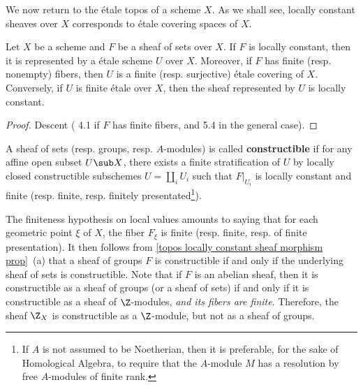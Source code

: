 We now return to the \'etale topos of a scheme $X$. As we shall see,  locally constant sheaves over $X$ corresponds to \'etale covering spaces of $X$.
\begin{proposition}\label{scheme etale locally constant sheaf represented by etale cover}
Let $X$ be a scheme and $F$ be a sheaf of sets over $X$. If $F$ is locally constant, then it is represented by a \'etale scheme $U$ over $X$. Moreover, if $F$ has finite (resp. nonempty) fibers, then $U$ is a finite (resp. surjective) \'etale covering of $X$. Conversely, if $U$ is finite \'etale over $X$, then the sheaf represented by $U$ is locally constant.
\end{proposition}
\begin{proof}
Descent (\cite{SGA1}  4.1 if $F$ has finite fibers, and \cite{SGA3}  5.4 in the general case).
\end{proof}

\begin{definition}
A sheaf of sets (resp. groups, resp. $A$-modules) is called \textbf{constructible} if for any affine open subset $U\sub X$, there exists a finite stratification of $U$ by locally closed constructible subschemes $U=\coprod_iU_i$ such that $F|_{U_i}$ is locally constant and finite (resp. finite, resp. finitely presentated\footnote{If $A$ is not assumed to be Noetherian, then it is preferable, for the sake of Homological Algebra, to require that the $A$-module $M$ has a resolution by free $A$-modules of finite rank.}).
\end{definition}

The finiteness hypothesis on local values amounts to saying that for each geometric point $\xi$ of $X$, the fiber $F_\xi$ is finite (resp. finite, resp. of finite presentation). It then follows from \cref{topos locally constant sheaf morphism prop}~(a) that a sheaf of groups $F$ is constructible if and only if the underlying sheaf of sets is constructible. Note that if $F$ is an abelian sheaf, then it is constructible as a sheaf of groups (or a sheaf of sets) if and only if it is constructible as a sheaf of $\Z$-modules, \textit{and its fibers are finite}. Therefore, the sheaf $\Z_X$ is constructible as a $\Z$-module, but not as a sheaf of groups.

